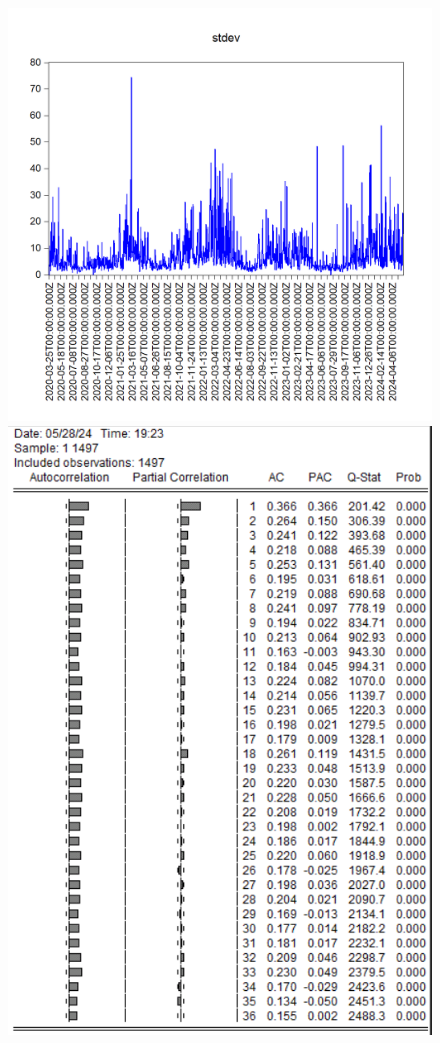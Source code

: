 \documentclass{article} %
\begin{document}
\begin{figure}[H]
    \centering
    \begin{minipage}{0.5\linewidth}
        \includegraphics[width=\linewidth]{images/image34.png}
        \end{minipage}%
    \begin{minipage}{0.5\linewidth}
        \includegraphics[width=\linewidth]{images/Capture3.PNG}

\end{minipage}
\end{figure}
\end{document}
